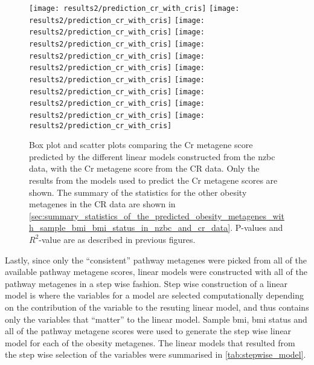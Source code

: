 \begin{figure}[htpb]
	\centering
	\texttt{[image: results2/prediction\_cr\_with\_cris]}
	\texttt{[image: results2/prediction\_cr\_with\_cris]}
	\texttt{[image: results2/prediction\_cr\_with\_cris]}
	\texttt{[image: results2/prediction\_cr\_with\_cris]}
	\texttt{[image: results2/prediction\_cr\_with\_cris]}
	\texttt{[image: results2/prediction\_cr\_with\_cris]}
	\texttt{[image: results2/prediction\_cr\_with\_cris]}
	\texttt{[image: results2/prediction\_cr\_with\_cris]}
	\texttt{[image: results2/prediction\_cr\_with\_cris]}
	\texttt{[image: results2/prediction\_cr\_with\_cris]}
	\texttt{[image: results2/prediction\_cr\_with\_cris]}
	\caption[Comparison of the predicted Cr metagene scores with the Cr metagene score from the CR data]{ Box plot and scatter plots comparing the Cr metagene score predicted by the different linear models constructed from the \gls{nzbc} data, with the Cr metagene score from the CR data.
	Only the results from the models used to predict the Cr metagene scores are shown.
	The summary of the statistics for the other obesity metagenes in the CR data are shown in \cref{sec:summary_statistics_of_the_predicted_obesity_metagenes_with_sample_bmi_bmi_status_in_nzbc_and_cr_data}.
	P-values and $R^2$-value are as described in previous figures.
	}
	\label{fig:predict_cr_cris}
\end{figure}

\noindent
Lastly, since only the ``consistent'' pathway metagenes were picked from all of the available pathway metagene scores, linear models were constructed with all of the pathway metagenes in a step wise fashion.
Step wise construction of a linear model is where the variables for a model are selected computationally depending on the contribution of the variable to the resuting linear model, and thus contains only the variables that ``matter'' to the linear model.
Sample \gls{bmi}, \gls{bmi} status and all of the pathway metagene scores were used to generate the step wise linear model for each of the obesity metagenes.
The linear models that resulted from the step wise selection of the variables were summarised in \cref{tab:stepwise_model}.

